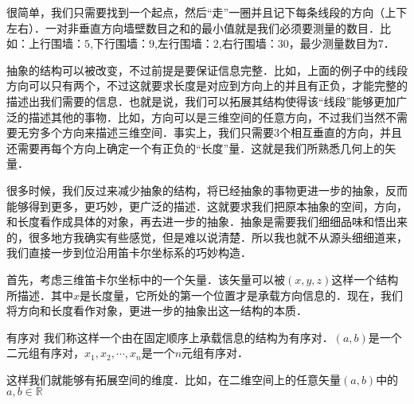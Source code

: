 很简单，我们只需要找到一个起点，然后“走”一圈并且记下每条线段的方向（上下左右）．一对非垂直方向墙壁数目之和的最小值就是我们必须要测量的数目．比如：上行围墙：$5$,下行围墙：$9$,左行围墙：$2$,右行围墙：$30$，最少测量数目为$7$．

抽象的结构可以被改变，不过前提是要保证信息完整．比如，上面的例子中的线段方向可以只有两个，不过这就要求长度是对应到方向上的并且有正负，才能完整的描述出我们需要的信息．也就是说，我们可以拓展其结构使得该“线段”能够更加广泛的描述其他的事物．比如，方向可以是三维空间的任意方向，不过我们当然不需要无穷多个方向来描述三维空间．事实上，我们只需要$3$个相互垂直的方向，并且还需要再每个方向上确定一个有正负的“长度”量．这就是我们所熟悉几何上的矢量．

很多时候，我们反过来减少抽象的结构，将已经抽象的事物更进一步的抽象，反而能够得到更多，更巧妙，更广泛的描述．这就要求我们把原本抽象的空间，方向，和长度看作成具体的对象，再去进一步的抽象．抽象是需要我们细细品味和悟出来的，很多地方我确实有些感觉，但是难以说清楚．所以我也就不从源头细细道来，我们直接一步到位沿用笛卡尔坐标系的巧妙构造．

首先，考虑三维笛卡尔坐标中的一个矢量．该矢量可以被$(x,y,z)$这样一个结构所描述．其中$x$是长度量，它所处的第一个位置才是承载方向信息的．现在，我们将方向和长度看作对象，更进一步的抽象出这一结构的本质．
\begin{definition}{有序对}
我们称这样一个由在固定顺序上承载信息的结构为有序对．$(a,b)$是一个二元组有序对，$x_1,x_2,\cdots,x_n$是一个$n$元组有序对．
\end{definition}
这样我们就能够有拓展空间的维度．比如，在二维空间上的任意矢量$(a,b)$中的$a,b\in \mathbb R$


